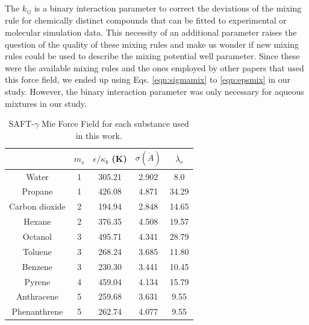 \documentclass[final,12p,times,twocolumn]{elsarticle}
\begin{document}
   The $k_{ij}$ is a binary interaction parameter to correct the deviations of the mixing rule for chemically distinct compounds that can be fitted to experimental or molecular simulation data. This necessity of an additional parameter raises the question of the quality of these mixing rules and make us wonder if new mixing rules could be used to describe the mixing potential well parameter. Since these were the available mixing rules and the ones employed by other papers that used this force field, we ended up using Eqs. \ref{eqn:sigmamix} to \ref{eqn:epsmix} in our study. However, the binary interaction parameter was only necessary for aqueous mixtures in our study.  
	
	\begin{table}[h]
		\centering
		\caption{SAFT-$\gamma$ Mie Force Field for each substance used in this work.}
		\label{tbl:parameters}
		\begin{tabular}{ccccc}
			\hline\hline
			& $m_s$ & $\epsilon/\kappa_{b}$ (K) & $\sigma (\dot{A})$ & $\lambda_r$ \\ \hline
			Water \cite{lobanova2016}        & 1     & 305.21               & 2.902              & 8.0         \\
			Propane \cite{herdes2015}        & 1     & 426.08               & 4.871              & 34.29       \\
			Carbon dioxide \cite{herdes2015} & 2     & 194.94               & 2.848              & 14.65       \\
			Hexane \cite{herdes2015}         & 2     & 376.35               & 4.508              & 19.57       \\
			Octanol \cite{ervik2016}         & 3     & 495.71               & 4.341              & 28.79       \\
			Toluene \cite{muller2017}        & 3     & 268.24               & 3.685              & 11.80       \\
			Benzene \cite{muller2017}        & 3     & 230.30               & 3.441              & 10.45       \\
			Pyrene \cite{muller2017}         & 4     & 459.04               & 4.134              & 15.79       \\
			Anthracene \cite{muller2017}     & 5     & 259.68               & 3.631              & 9.55        \\
			Phenanthrene                     & 5     & 262.74               & 4.077              & 9.55        \\ \hline\hline
		\end{tabular}
		
	\end{table}
	
\end{document}
